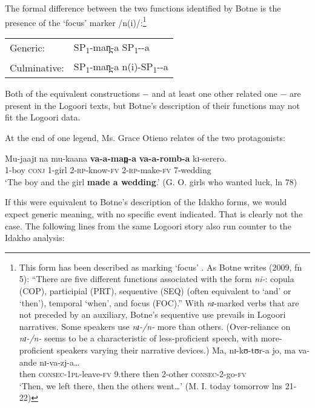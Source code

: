 \documentclass[output=paper]{langsci/langscibook}
\begin{document}
\newpage
The formal difference between the two functions identified by Botne is the presence of the ‘focus’ marker /n(i)/:\footnote{This
 form has been described as marking ‘focus’ \citep{Dalgish1979,Nurse2006,Botne2009}. As Botne writes (2009, fn 5): “There are five different functions associated with the form \textit{ni-}: copula (COP), participial (PRT), sequentive (SEQ) (often equivalent to ‘and’ or ‘then’), temporal ‘when’, and focus (FOC).” With \textit{nɪ}-marked verbs that are not preceded by an auxiliary, Botne’s sequentive use prevails in Logoori narratives. Some speakers use \textit{nɪ-/n-} more than others. (Over-reliance on \textit{nɪ-/n-} seems to be a characteristic of less-proficient speech, with more-proficient speakers varying their narrative devices.)  
  \ea
  \gll Ma,   nɪ-kʊ-tʊr-a     jo,  ma   va-ande     nɪ-va-zj-a…  \\
  then  \textsc{consec}-\textsc{1pl-}leave-\textsc{fv}  9.there  then  2-other    \textsc{consec}-2-go-\textsc{fv}\\
  \glt ‘Then, we left there, then the others went…’ (M. I. today tomorrow lns 21-22)
  \z
}

\ea
\begin{tabular}{ll}
Generic:  & SP\textsubscript{1}-man̪-a   SP\textsubscript{1}-{\longrule}-a \\
Culminative:  & SP\textsubscript{1}-man̪-a  n(i)-SP\textsubscript{1}-{\longrule}-a
\end{tabular}
\z

Both of the equivalent constructions $-$ and at least one other related one $-$ are present in the Logoori texts, but Botne’s description of their functions may not fit the Logoori data.

At the end of one legend, Ms. Grace Otieno relates of the two protagonists:

\ea\label{ex:sarvasy:26}
\gll Mu-jaajɪ   na   mu-kaana   \textbf{va-a-man̪-a}   \textbf{va-a-romb-a}     kɪ-serero. \\
1-boy    \textsc{conj}  1-girl    2-\textsc{rp}-know-\textsc{fv}  2-\textsc{rp}-make-\textsc{fv}  7-wedding \\
\glt ‘The boy and the girl \textbf{made a wedding}.’ (G. O. girls who wanted luck, ln 78)
\z

If this were equivalent to Botne’s description of the Idakho forms, we would expect generic meaning, with no specific event indicated. That is clearly not the case. The following lines from the same Logoori story also run counter to the Idakho analysis: 
\end{document}
